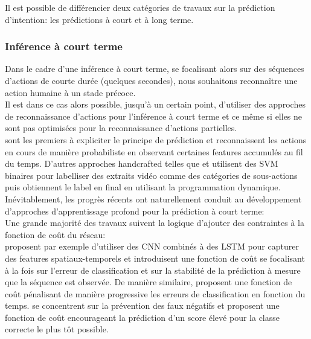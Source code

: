 Il est possible de différencier deux catégories de travaux sur la prédiction d'intention: les prédictions à court  et à long terme.

\subsubsection{Inférence à court terme}
Dans le cadre d'une inférence à court terme, se focalisant alors sur des séquences d'actions de courte durée (quelques secondes), nous souhaitons reconnaître une action humaine à un stade précoce.\\

Il est dans ce cas alors possible, jusqu'à un certain point, d'utiliser des approches de reconnaissance d'actions pour l'inférence à court terme et ce même si elles ne sont pas optimisées pour la reconnaissance d'actions partielles.\\

\cite{ryoo2011human} sont les premiers à expliciter le principe de prédiction et reconnaissent les actions en cours de manière probabiliste en observant certaines features accumulés au fil du temps. D'autres approches handcrafted telles que \cite{soomro2018online} et \cite{soomro2016predicting} utilisent des SVM binaires pour labelliser des extraits vidéo comme des catégories de sous-actions puis obtiennent le label en final en utilisant la programmation dynamique.\\

Inévitablement, les progrès récents ont naturellement conduit au développement d'approches d'apprentissage profond pour la prédiction à court terme:\\ 

Une grande majorité des travaux suivent la logique d'ajouter des contraintes à la fonction de coût du réseau:\\
\cite{ma2016learning} proposent par exemple d'utiliser des CNN combinés à des LSTM pour capturer des features spatiaux-temporels et introduisent une fonction de coût se focalisant à la fois sur l'erreur de classification et sur la stabilité de la prédiction à mesure que la séquence est observée. De manière similaire, \cite{jain2016recurrent} proposent une fonction de coût pénalisant de manière progressive les erreurs de classification en fonction du temps.
\cite{2017arXiv170307023S} se concentrent sur la prévention des faux négatifs et proposent une fonction de coût encourageant la prédiction d'un score élevé pour la classe correcte le plus tôt possible.\\


